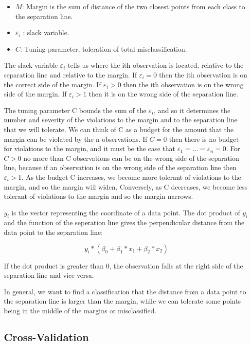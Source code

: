 \documentclass[10pt,letterpaper]{article}
\providecommand{\tightlist}{%
  \setlength{\itemsep}{0pt}\setlength{\parskip}{0pt}}
\begin{document}
\begin{itemize}
\tightlist
\item
  \(M\): Margin is the sum of distance of the two closest points from
  each class to the separation line.
\item
  \(\varepsilon_i\) : slack variable.
\item
  \(C\): Tuning parameter, toleration of total misclassification.
\end{itemize}

The slack variable \(\varepsilon_i\) tells us where the ith observation
is located, relative to the separation line and relative to the margin.
If \(\varepsilon_i = 0\) then the ith observation is on the correct side
of the margin. If \(\varepsilon_i > 0\) then the ith observation is on
the wrong side of the margin. If \(\varepsilon_i > 1\) then it is on the
wrong side of the separation line.

The tuning parameter C bounds the sum of the \(\varepsilon_i\), and so
it determines the number and severity of the violations to the margin
and to the separation line that we will tolerate. We can think of C as a
budget for the amount that the margin can be violated by the n
observations. If \(C = 0\) then there is no budget for violations to the
margin, and it must be the case that
\(\varepsilon_1 = . . . = \varepsilon_n = 0\). For \(C > 0\) no more
than C observations can be on the wrong side of the separation line,
because if an observation is on the wrong side of the separation line
then \(\varepsilon_i > 1\). As the budget C increases, we become more
tolerant of violations to the margin, and so the margin will widen.
Conversely, as C decreases, we become less tolerant of violations to the
margin and so the margin narrows.

\(y_i\) is the vector representing the coordinate of a data point. The
dot product of \(y_i\) and the function of the seperation line gives the
perpendicular distance from the data point to the separation line:

\[y_i * ( \beta_0 + \beta_1 * x_1 + \beta_2 * x_2 )\]

If the dot product is greater than 0, the observation falls at the right
side of the separation line and vice versa.

In general, we want to find a classification that the distance from a
data point to the separation line is larger than the margin, while we
can tolerate some points being in the middle of the margins or
misclassified.

\subsection{Cross-Validation}\label{cross-validation}
\end{document}
